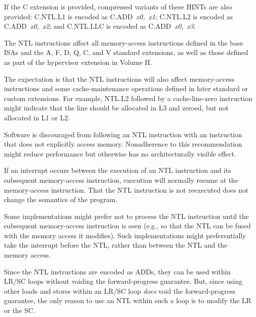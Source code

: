 If the C extension is provided, compressed variants of these HINTs are also
provided:
C.NTL.L1 is encoded as \mbox{C.ADD {\em x0, x1}};
C.NTL.L2 is encoded as \mbox{C.ADD {\em x0, x2}};
and C.NTL.LLC is encoded as \mbox{C.ADD {\em x0, x3}}.

The NTL instructions affect all memory-access instructions defined in the
base ISAs and the A, F, D, Q, C, and V standard extensions,
as well as those defined as part of the hypervisor extension in Volume II.

\begin{commentary}
The expectation is that the NTL instructions will also affect memory-access
instructions and some cache-maintenance operations
defined in later standard or custom extensions.
For example, NTL.L2 followed by a cache-line-zero instruction might indicate
that the line should be allocated in L3 and zeroed, but not allocated in
L1 or L2.
\end{commentary}

Software is discouraged from following an NTL instruction with an
instruction that does not explicitly access memory.
Nonadherence to this recommendation might reduce performance but
otherwise has no architecturally visible effect.

\begin{commentary}
If an interrupt occurs between the execution of an NTL instruction and its
subsequent memory-access instruction, execution will normally resume at the
memory-access instruction.
That the NTL instruction is not reexecuted does not change the semantics of
the program.

Some implementations might prefer not to process the NTL instruction until the
subsequent memory-access instruction is seen (e.g., so that the NTL can be
fused with the memory access it modifies).
Such implementations might preferentially take the interrupt before the NTL,
rather than between the NTL and the memory access.
\end{commentary}

\begin{commentary}
Since the NTL instructions are encoded as ADDs, they can be used within LR/SC
loops without voiding the forward-progress guarantee.
But, since using other loads and stores within an LR/SC loop {\em does}
void the forward-progress guarantee, the only reason to use an NTL
within such a loop is to modify the LR or the SC.
\end{commentary}
